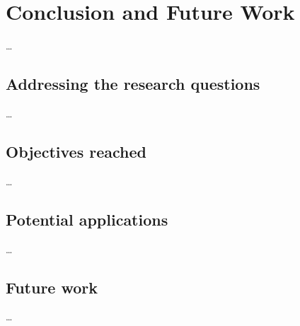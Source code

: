 \chapter{Conclusion and Future Work} \label{chap:concl}

\dots


\section{Addressing the research questions}
\dots

\section{Objectives reached}

\dots

\section{Potential applications}
\dots


\section{Future work}


\dots
